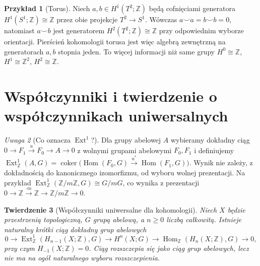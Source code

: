 \documentclass[11pt,a4paper,oneside]{report}
\newcommand{\Z}{\mathbb{Z}}
\theoremstyle{plain}
\newtheorem{twierdzenie}{Twierdzenie}[section]
\theoremstyle{definition}
\newtheorem{przyklad}[twierdzenie]{Przykład}
\theoremstyle{remark}
\newtheorem{uwaga}[twierdzenie]{Uwaga}
\begin{document}
\begin{przyklad}[Torus]
Niech $a,b\in H^1(T^2;\Z)$ będą cofnięciami generatora
$H^1(S^1;\Z)\cong\Z$ przez obie projekcje $T^2\to S^1$.
Wówczas $a\smile a=b\smile b=0$, natomiast $a\smile b$
jest generatorem $H^2(T^2;\Z)\cong\Z$ przy odpowiednim
wyborze orientacji. Pierścień kohomologii torusa jest więc
algebrą zewnętrzną na generatorach $a,b$ stopnia jeden.
To więcej informacji niż same grupy $H^0\cong\Z$,
$H^1\cong\Z^2$, $H^2\cong\Z$.
\end{przyklad}

\section{Współczynniki i twierdzenie o współczynnikach uniwersalnych}

\begin{uwaga}[Co oznacza $\operatorname{Ext}^1$?]
Dla grupy abelowej $A$ wybieramy dokładny ciąg
$0\to F_1\xrightarrow{u} F_0\to A\to0$ z wolnymi grupami
abelowymi $F_0,F_1$ i definiujemy
$\operatorname{Ext}^1_{\Z}(A,G)=
\operatorname{coker}\bigl(\operatorname{Hom}(F_0,G)
\xrightarrow{u^*}\operatorname{Hom}(F_1,G)\bigr)$.
Wynik nie zależy, z dokładnością do kanonicznego izomorfizmu,
od wyboru wolnej prezentacji. Na przykład
$\operatorname{Ext}^1_{\Z}(\Z/m\Z,G)\cong G/mG$,
co wynika z prezentacji $0\to\Z\xrightarrow{\cdot m}\Z
\to\Z/m\Z\to0$.
\end{uwaga}

\begin{twierdzenie}[Współczynniki uniwersalne dla kohomologii]
Niech $X$ będzie przestrzenią topologiczną, $G$ grupą abelową,
a $n\geq0$ liczbą całkowitą. Istnieje naturalny krótki ciąg
dokładny grup abelowych
\[
0\longrightarrow\operatorname{Ext}^1_{\Z}(H_{n-1}(X;\Z),G)
\longrightarrow H^n(X;G)
\longrightarrow\operatorname{Hom}_{\Z}(H_n(X;\Z),G)
\longrightarrow0,
\]
przy czym $H_{-1}(X;\Z)=0$. Ciąg rozszczepia się jako ciąg
grup abelowych, lecz nie ma na ogół naturalnego wyboru rozszczepienia.
\end{twierdzenie}
\end{document}
